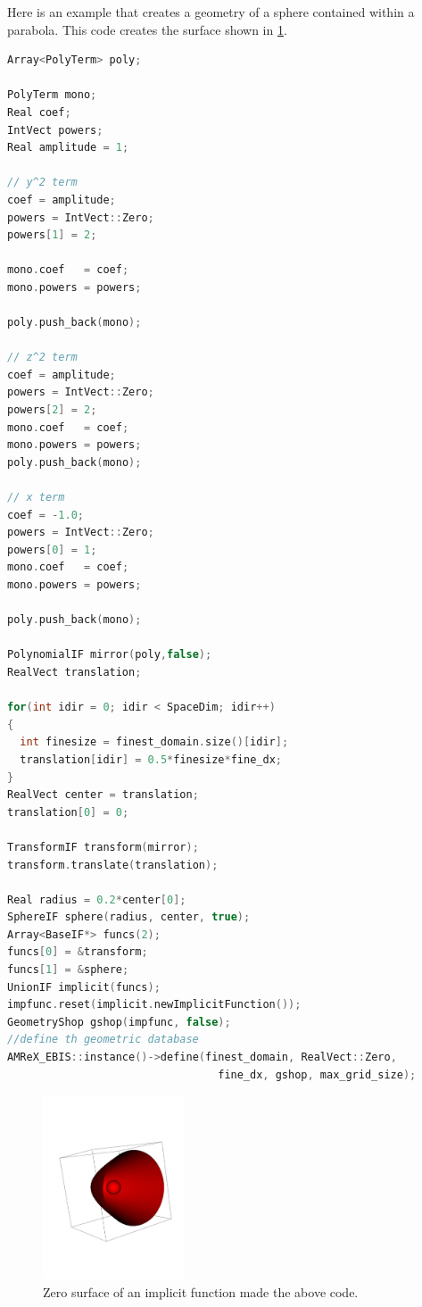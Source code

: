 Here is an example that creates a geometry of a sphere contained
within a parabola. This code
creates the surface shown in \ref{fig::parabolasphere}.

\begin{lstlisting}[language=cpp]
Array<PolyTerm> poly;

PolyTerm mono;
Real coef;
IntVect powers;
Real amplitude = 1;

// y^2 term
coef = amplitude;
powers = IntVect::Zero;
powers[1] = 2;

mono.coef   = coef;
mono.powers = powers;

poly.push_back(mono);

// z^2 term
coef = amplitude;
powers = IntVect::Zero;
powers[2] = 2;
mono.coef   = coef;
mono.powers = powers;
poly.push_back(mono);

// x term
coef = -1.0;
powers = IntVect::Zero;
powers[0] = 1;
mono.coef   = coef;
mono.powers = powers;

poly.push_back(mono);

PolynomialIF mirror(poly,false);
RealVect translation;

for(int idir = 0; idir < SpaceDim; idir++)
{
  int finesize = finest_domain.size()[idir];
  translation[idir] = 0.5*finesize*fine_dx;
}
RealVect center = translation;
translation[0] = 0;

TransformIF transform(mirror);
transform.translate(translation);

Real radius = 0.2*center[0];
SphereIF sphere(radius, center, true);
Array<BaseIF*> funcs(2);
funcs[0] = &transform;
funcs[1] = &sphere;
UnionIF implicit(funcs);
impfunc.reset(implicit.newImplicitFunction());
GeometryShop gshop(impfunc, false);
//define th geometric database
AMReX_EBIS::instance()->define(finest_domain, RealVect::Zero,
                                 fine_dx, gshop, max_grid_size);
\end{lstlisting}

\begin{figure}[h]
  \centering
  \includegraphics[width=0.375\textwidth]{./EB/parabsphere.pdf}
  \caption{\label{fig::parabolasphere} Zero surface of an implicit
    function made the above code.}
\end{figure}

